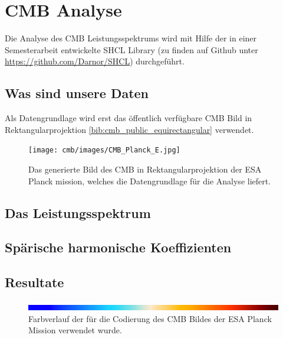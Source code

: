 \section{CMB Analyse}

Die Analyse des CMB Leistungsspektrums wird mit Hilfe der in einer 
Semesterarbeit entwickelte SHCL Library (zu finden auf Github unter 
\url{https://github.com/Darnor/SHCL}) durchgeführt.

\subsection{Was sind unsere Daten}
Als Datengrundlage wird erst das öffentlich verfügbare CMB Bild in 
Rektangularprojektion \ref{bib:cmb_public_equirectangular} verwendet.

\begin{figure}
	\centering
	\texttt{[image: cmb/images/CMB\_Planck\_E.jpg]}
	\caption{Das generierte Bild des CMB in Rektangularprojektion der ESA 
	Planck mission, welches die Datengrundlage für die Analyse liefert.}
	\label{fig:cmb-rectangular}
\end{figure}

\subsection{Das Leistungsspektrum}


\subsection{Spärische harmonische Koeffizienten}

\subsection{Resultate}

\begin{figure}
	\centering
	\includegraphics[width=\linewidth]{cmb/images/color-strip-full.png}
	\caption{Farbverlauf der für die Codierung des CMB Bildes der ESA Planck 
	Mission verwendet wurde.}
	\label{fig:color-strip-orig}
\end{figure}

